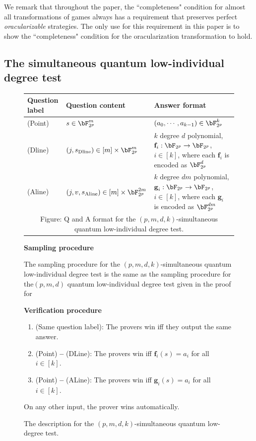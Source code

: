 We remark that throughout the paper, the ``completeness" condition for almost all transformations of games always has a requirement that preserves perfect \emph{oracularizable} strategies. The only use for this requirement in this paper is to show the ``completeness" condition for the oracularization transformation to hold. 
 
\subsection{The simultaneous quantum low-individual degree test} \label{sec:simuQILD}


\begin{figure}[!b]
	\centering
	\begin{gamespec}
		\setlength{\tabcolsep}{1em}
		\footnotesize
		\begin{tabularx}{\textwidth}{ l   l   X   }
			\toprule
			Question label & Question content & Answer format \\
			\midrule
			(Point)&  $s \in \bF_{2^p}^m$& $(a_0, \cdots, a_{k-1}) \in  \bF_{2^p}^k$\\
			(Dline)&  $(j, s_{\text{Dline}}) \in [m] \times \bF_{2^p}^m$& $k$ degree $d$ polynomial, $ \textbf{f}_i: \bF_{2^p} \rightarrow  \bF_{2^p}$, $i \in [k]$, where each $\textbf{f}_i$ is encoded as $\bF_{2^p}^d$ \\
			(Aline)&  $(j,v, s_{\text{Aline}}) \in [m] \times \bF_{2^p}^{2m}$ &  $k$ degree $dm$ polynomial, $\textbf{g}_i: \bF_{2^p} \rightarrow  \bF_{2^p}$, $i \in [k]$, where each $\textbf{g}_i$ is encoded as $\bF_{2^p}^{dm}$ \\
			\bottomrule
			\multicolumn{3}{c}{Figure: Q and A format for the $(p,m,d,k)$-simultaneous quantum low-individual degree test.}
		\end{tabularx}
		\normalsize
		\begin{center}
			\textbf{Sampling procedure}
		\end{center}
		The sampling procedure for the $(p,m,d,k)$-simultaneous quantum low-individual degree test is the same as the sampling procedure for the$(p,m,d)$ quantum low-individual degree test given in the proof for~
		\begin{center}
			\textbf{Verification procedure}
		\end{center}
		\begin{enumerate}
			\item (Same question label): The provers win iff they output the same answer. 
			\item (Point) \textbf{--} (DLine): The provers win iff $\textbf{f}_i(s) = a_i$ for all $i \in [k]$. 
			\item (Point) \textbf{--} (ALine): The provers win iff $\textbf{g}_i(s) = a_i$ for all $i \in [k]$. 
		\end{enumerate}
		On any other input, the prover wins automatically. 
		\vspace{1em}
	\end{gamespec}
	\caption{The description for the $(p,m,d,k)$-simultaneous quantum low-degree test. }
	\label{fig:simuLDT}
\end{figure}

